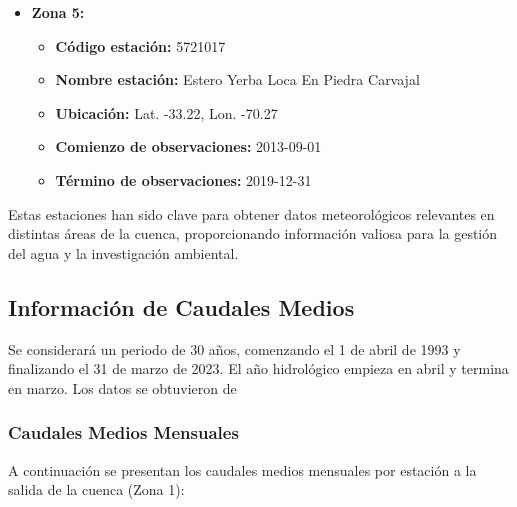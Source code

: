 \documentclass{article} %
\begin{document}
\begin{itemize}
    \item \textbf{Zona 5:}
    \begin{itemize}
        \item \textbf{Código estación:} 5721017
        \item \textbf{Nombre estación:} Estero Yerba Loca En Piedra Carvajal
        \item \textbf{Ubicación:} Lat. -33.22, Lon. -70.27
        \item \textbf{Comienzo de observaciones:} 2013-09-01
        \item \textbf{Término de observaciones:} 2019-12-31
    \end{itemize}
\end{itemize}

Estas estaciones han sido clave para obtener datos meteorológicos relevantes en distintas áreas de la cuenca, proporcionando información valiosa para la gestión del agua y la investigación ambiental.

\newpage
\subsection{Información de Caudales Medios}

Se considerará un periodo de 30 años, comenzando el 1 de abril de 1993 y finalizando el 31 de marzo de 2023. El año hidrológico empieza en abril y termina en marzo. Los datos se obtuvieron de \textbf{\citet{snia2024}}

\subsubsection{Caudales Medios Mensuales}

A continuación se presentan los caudales medios mensuales por estación a la salida de la cuenca (Zona 1):
\end{document}
